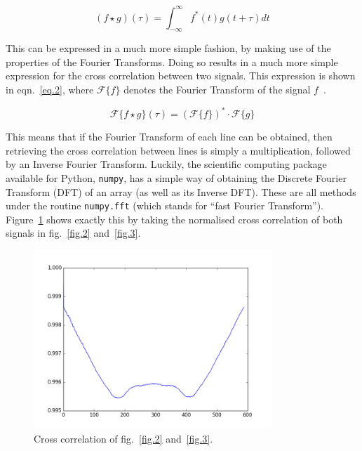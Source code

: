 \documentclass[a4paper,12pt]{article}
\begin{document}
\begin{equation}
 (f \star g)(\tau) = \int_{-\infty}^{\infty} f^*(t) g(t+\tau) dt
 \label{eq.1}
\end{equation}

This can be expressed in a much more simple fashion, by making use of the properties of the Fourier Transforms. Doing so results in a much more simple expression for the cross correlation between two signals. This expression is shown in eqn.~\ref{eq.2}, where $\mathcal{F}\{ f \}$ denotes the Fourier Transform of the signal $f$~\cite{bracewell2012fourier}.

\begin{equation}
 \mathcal{F}\{ f \star g \}(\tau) = (\mathcal{F}\{ f \})^* \cdot \mathcal{F}\{ g \}
 \label{eq.2}
\end{equation}

This means that if the Fourier Transform of each line can be obtained, then retrieving the cross correlation between lines is simply a multiplication, followed by an Inverse Fourier Transform. Luckily, the scientific computing package available for Python, \texttt{numpy}, has a simple way of obtaining the Discrete Fourier Transform (DFT) of an array (as well as its Inverse DFT). These are all methods under the routine \texttt{numpy.fft} (which stands for ``fast Fourier Transform''). Figure~\ref{fig.4} shows exactly this by taking the normalised cross correlation of both signals in fig.~\ref{fig.2} and~\ref{fig.3}. 

\begin{figure}[h!]
\centering
\includegraphics[width=0.8\textwidth]{img/xcorrelation}
\caption{Cross correlation of fig.~\ref{fig.2} and~\ref{fig.3}.}
\label{fig.4}
\end{figure}
\end{document}
